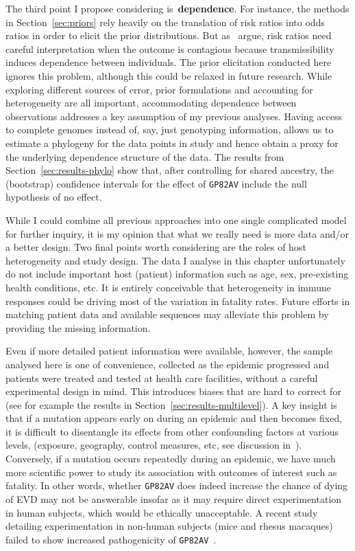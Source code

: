 The third point I propose considering is~\textbf{dependence}.
For instance, the methods in Section~\ref{sec:priors} rely heavily on the translation of risk ratios into odds ratios in order to elicit the prior distributions.
But as~\cite{Morozova2018} argue, risk ratios need careful interpretation when the outcome is contagious because transmissibility induces dependence between individuals.
The prior elicitation conducted here ignores this problem, although this could be relaxed in future research.
While exploring different sources of error, prior formulations and accounting for heterogeneity are all important, accommodating dependence between observations addresses a key assumption of my previous analyses.
Having access to complete genomes instead of, say, just genotyping information, allows us to estimate a phylogeny for the data points in study and hence obtain a proxy for the underlying dependence structure of the data.
The results from Section~\ref{sec:results-phylo} show that, after controlling for shared ancestry, the (bootstrap) confidence intervals for the effect of \verb|GP82AV| include the null hypothesis of no effect.


While I could combine all previous approaches into one single complicated model for further inquiry, it is my opinion that what we really need is more data and/or a better design.
Two final points worth considering are the roles of host heterogeneity and study design.
The data I analyse in this chapter unfortunately do not include important host (patient) information such as age, sex, pre-existing health conditions, etc.
It is entirely conceivable that heterogeneity in immune responses could be driving most of the variation in fatality rates.
Future efforts in matching patient data and available sequences may alleviate this problem by providing the missing information.

Even if more detailed patient information were available, however, the sample analysed here is one of convenience, collected as the epidemic progressed and patients were treated and tested at health care facilities, without a careful experimental design in mind.
This introduces biases that are hard to correct for (see for example the results in Section~\ref{sec:results-multilevel}).
A key insight is that if a mutation appears early on during an epidemic and then becomes fixed, it is difficult to disentangle its effects from other confounding factors at various levels, (exposure, geography, control measures, etc, see discussion in~\cite{Diehl2016}).
Conversely, if a mutation occurs repeatedly during an epidemic, we have much more scientific power to study its association with outcomes of interest such as fatality.
In other words, whether \verb|GP82AV| does indeed increase the chance of dying of EVD may not be answerable insofar as it may require direct experimentation in human subjects, which would be ethically unacceptable.
A recent study detailing experimentation in non-human subjects (mice and rhesus macaques) failed to show increased pathogenicity of \verb|GP82AV|~\citep{Marzi2018}.

